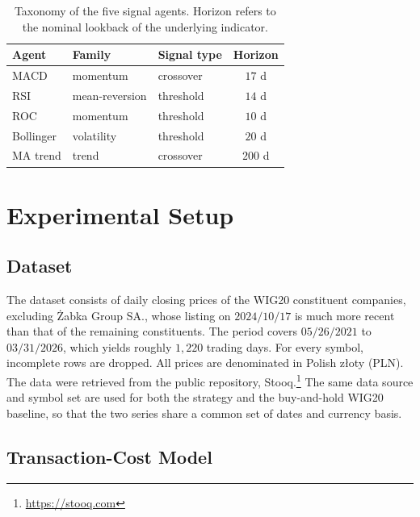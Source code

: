 \documentclass{ieeeaccess}
\begin{document}
\begin{table}[t]
\centering
\caption{Taxonomy of the five signal agents. Horizon refers to the nominal lookback of the underlying indicator.}
\label{tab:taxonomy}
\begin{tabular}{lllc}
\toprule
Agent & Family & Signal type & Horizon \\
\midrule
MACD          & momentum       & crossover & $17$ d \\
RSI           & mean-reversion & threshold & $14$ d \\
ROC           & momentum       & threshold & $10$ d \\
Bollinger     & volatility     & threshold & $20$ d \\
MA trend      & trend          & crossover & $200$ d \\
\bottomrule
\end{tabular}
\end{table}

\section{Experimental Setup}
\label{sec:setup}

\subsection{Dataset}
\label{subsec:dataset}

The dataset consists of daily closing prices of the WIG20 constituent companies, excluding \.{Z}abka Group SA., whose listing on $2024/10/17$ is much more recent than that of the remaining constituents. The period covers $05/26/2021$ to $03/31/2026$, which yields roughly $1{,}220$ trading days. For every symbol, incomplete rows are dropped. All prices are denominated in Polish z{\l}oty (PLN). The data were retrieved from the public repository, Stooq.\footnote{\url{https://stooq.com}} The same data source and symbol set are used for both the strategy and the buy-and-hold WIG20 baseline, so that the two series share a common set of dates and currency basis.

\subsection{Transaction-Cost Model}
\label{subsec:costs}
\end{document}
